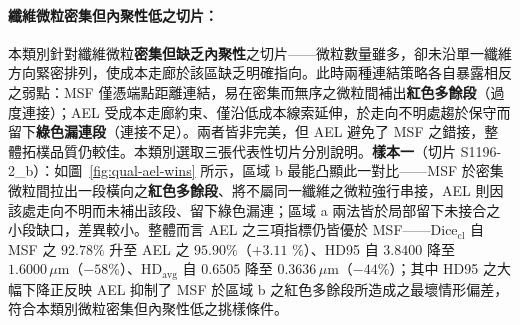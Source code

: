 \paragraph{纖維微粒密集但內聚性低之切片：} 本類別針對纖維微粒\textbf{密集但缺乏內聚性}之切片——微粒數量雖多，卻未沿單一纖維方向緊密排列，使成本走廊於該區缺乏明確指向。此時兩種連結策略各自暴露相反之弱點：MSF 僅憑端點距離連結，易在密集而無序之微粒間補出\textbf{紅色多餘段}（過度連接）；AEL 受成本走廊約束、僅沿低成本線索延伸，於走向不明處趨於保守而留下\textbf{綠色漏連段}（連接不足）。兩者皆非完美，但 AEL 避免了 MSF 之錯接，整體拓樸品質仍較佳。本類別選取三張代表性切片分別說明。\textbf{樣本一}（切片 S1196-2\_b）：如圖~\ref{fig:qual-ael-wins} 所示，區域 b 最能凸顯此一對比——MSF 於密集微粒間拉出一段橫向之\textbf{紅色多餘段}、將不屬同一纖維之微粒強行串接，AEL 則因該處走向不明而未補出該段、留下綠色漏連；區域 a 兩法皆於局部留下未接合之小段缺口，差異較小。整體而言 AEL 之三項指標仍皆優於 MSF——$\text{Dice}_{\text{cl}}$ 自 MSF 之 $92.78\%$ 升至 AEL 之 $95.90\%$（$+3.11$ \%）、HD95 自 $3.8400$ 降至 $1.6000\,\mu\text{m}$（$-58\%$）、$\text{HD}_{\text{avg}}$ 自 $0.6505$ 降至 $0.3636\,\mu\text{m}$（$-44\%$）；其中 HD95 之大幅下降正反映 AEL 抑制了 MSF 於區域 b 之紅色多餘段所造成之最壞情形偏差，符合本類別微粒密集但內聚性低之挑樣條件。


